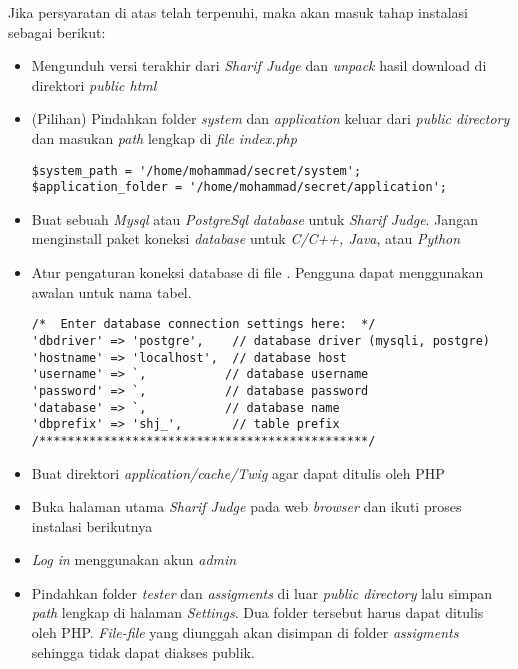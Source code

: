 Jika persyaratan di atas telah terpenuhi, maka akan masuk tahap instalasi sebagai berikut:
\begin{itemize}
	\item Mengunduh versi terakhir dari \textit{Sharif Judge} dan \textit{unpack} hasil download di direktori \textit{public html}
	\item (Pilihan) Pindahkan folder \textit{system} dan \textit{application} keluar dari \textit{public directory} dan
	masukan \textit{path} lengkap di \textit{file index.php} 
	\begin{lstlisting}[basicstyle=\ttfamily, frame=single,
columns=fullflexible, keepspaces=true, breaklines=true]
$system_path = '/home/mohammad/secret/system';
$application_folder = '/home/mohammad/secret/application';
\end{lstlisting}
	\item Buat sebuah \textit{Mysql} atau \textit{PostgreSql} \textit{database} untuk \textit{Sharif Judge}. Jangan menginstall paket koneksi \textit{database} untuk \textit{C/C++, Java}, atau \textit{Python}
	\item Atur pengaturan koneksi database di file . Pengguna dapat menggunakan awalan untuk nama tabel.
	\begin{lstlisting}[basicstyle=\ttfamily, frame=single,
columns=fullflexible, keepspaces=true, breaklines=true]
/*  Enter database connection settings here:  */
'dbdriver' => 'postgre',    // database driver (mysqli, postgre)
'hostname' => 'localhost',  // database host
'username' => `,           // database username
'password' => `,           // database password
'database' => `,           // database name
'dbprefix' => 'shj_',       // table prefix
/**********************************************/
\end{lstlisting}
	\item Buat direktori \textit{application/cache/Twig} agar dapat ditulis oleh PHP
	\item Buka halaman utama \textit{Sharif Judge} pada web \textit{browser} dan ikuti proses instalasi berikutnya
	\item \textit{Log in} menggunakan akun \textit{admin}
	\item Pindahkan folder \textit{tester} dan \textit{assigments} di luar \textit{public directory} lalu simpan \textit{path} lengkap di halaman \textit{Settings}. Dua folder tersebut harus dapat ditulis oleh PHP. \textit{File-file} yang diunggah akan disimpan di folder \textit{assigments} sehingga tidak dapat diakses publik.
\end{itemize}

